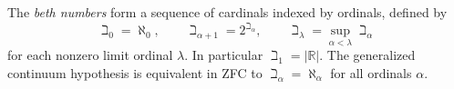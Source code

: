 
The \emph{beth numbers} form a sequence of cardinals indexed by ordinals, defined by
\[
\beth_0=\aleph_0,\qquad \beth_{\alpha+1}=2^{\beth_\alpha},\qquad \beth_\lambda=\sup_{\alpha<\lambda}\beth_\alpha
\]
for each nonzero limit ordinal $\lambda$. In particular $\beth_1=|\mathbb R|$. The generalized continuum hypothesis is equivalent in ZFC to $\beth_\alpha=\aleph_\alpha$ for all ordinals $\alpha$.
